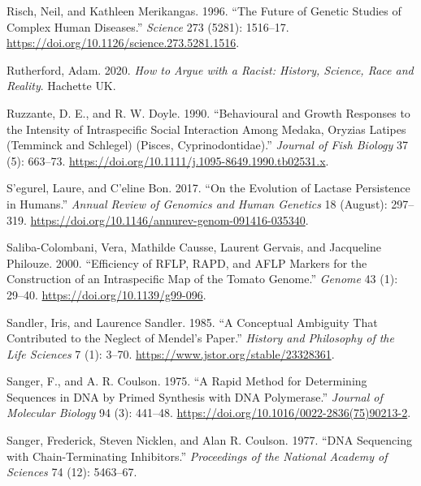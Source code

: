 \documentclass[
]{book}
\newlength{\cslhangindent}
\newlength{\cslentryspacingunit} %
\newenvironment{CSLReferences}[2] %
 {%
  \setlength{\parindent}{0pt}
  \ifodd #1
  \let\oldpar\par
  \def\par{\hangindent=\cslhangindent\oldpar}
  \fi
  \setlength{\parskip}{#2\cslentryspacingunit}
 }%
 {}
\begin{document}
\begin{CSLReferences}{1}{0}
\leavevmode{}%
Risch, Neil, and Kathleen Merikangas. 1996. {``The {Future} of {Genetic Studies} of {Complex Human Diseases}.''} \emph{Science} 273 (5281): 1516--17. \url{https://doi.org/10.1126/science.273.5281.1516}.

\leavevmode{}%
Rutherford, Adam. 2020. \emph{How to Argue with a Racist: {History}, Science, Race and Reality}. {Hachette UK}.

\leavevmode{}%
Ruzzante, D. E., and R. W. Doyle. 1990. {``Behavioural and Growth Responses to the Intensity of Intraspecific Social Interaction Among Medaka, {Oryzias} Latipes ({Temminck} and {Schlegel}) ({Pisces}, {Cyprinodontidae}).''} \emph{Journal of Fish Biology} 37 (5): 663--73. \url{https://doi.org/10.1111/j.1095-8649.1990.tb02531.x}.

\leavevmode{}%
S'egurel, Laure, and C'eline Bon. 2017. {``On the {Evolution} of {Lactase Persistence} in {Humans}.''} \emph{Annual Review of Genomics and Human Genetics} 18 (August): 297--319. \url{https://doi.org/10.1146/annurev-genom-091416-035340}.

\leavevmode{}%
Saliba-Colombani, Vera, Mathilde Causse, Laurent Gervais, and Jacqueline Philouze. 2000. {``Efficiency of {RFLP}, {RAPD}, and {AFLP} Markers for the Construction of an Intraspecific Map of the Tomato Genome.''} \emph{Genome} 43 (1): 29--40. \url{https://doi.org/10.1139/g99-096}.

\leavevmode{}%
Sandler, Iris, and Laurence Sandler. 1985. {``A {Conceptual Ambiguity} That {Contributed} to the {Neglect} of {Mendel}'s {Paper}.''} \emph{History and Philosophy of the Life Sciences} 7 (1): 3--70. \url{https://www.jstor.org/stable/23328361}.

\leavevmode{}%
Sanger, F., and A. R. Coulson. 1975. {``A Rapid Method for Determining Sequences in {DNA} by Primed Synthesis with {DNA} Polymerase.''} \emph{Journal of Molecular Biology} 94 (3): 441--48. \url{https://doi.org/10.1016/0022-2836(75)90213-2}.

\leavevmode{}%
Sanger, Frederick, Steven Nicklen, and Alan R. Coulson. 1977. {``{DNA} Sequencing with Chain-Terminating Inhibitors.''} \emph{Proceedings of the National Academy of Sciences} 74 (12): 5463--67.


\end{CSLReferences}
\end{document}
